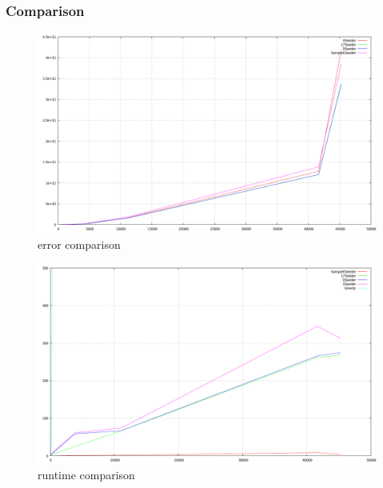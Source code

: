 \documentclass{beamer}
\begin{document}
\begin{frame}[fragile]
\frametitle{Comparison}
\begin{figure}[ht]
	\centering
	\includegraphics[scale=0.1]{resultcompare.png}
	\caption{error comparison}
\end{figure}
\begin{figure}[ht]
	\centering
	\includegraphics[scale=0.1]{runtimecompare.png}
	\caption{runtime comparison}
\end{figure}
\end{frame}


  
\end{document}
